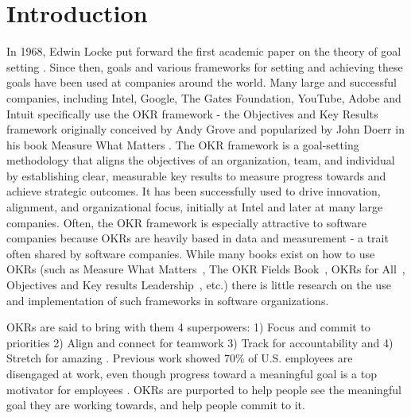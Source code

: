 \documentclass[sigconf, nonacm]{acmart}
\begin{document}
\section{Introduction}
In 1968, Edwin Locke put forward the first academic paper on the theory of goal setting \cite{locke}. Since then, goals and various frameworks for setting and achieving these goals have been used at companies around the world. Many large and successful companies, including Intel, Google, The Gates Foundation, YouTube, Adobe and Intuit specifically use the OKR framework - the Objectives and Key Results framework originally conceived by Andy Grove and popularized by John Doerr in his book Measure What Matters \cite{Doerr01}. The OKR framework is a goal-setting methodology that aligns the objectives of an organization, team, and individual by establishing clear, measurable key results to measure progress towards and achieve strategic outcomes.  It has been successfully used to drive innovation, alignment, and organizational focus, initially at Intel and later at many large companies\cite{Doerr01}. Often, the OKR framework is especially attractive to software companies because OKRs are heavily based in data and measurement - a trait often shared by software companies. While many books exist on how to use OKRs (such as Measure What Matters~\cite{Doerr01}, The OKR Fields Book~\cite{lamorte2022}, OKRs for All~\cite{vellore2022okrs}, Objectives and Key results Leadership~\cite{gray2019}, etc.) there is little research on the use and implementation of such frameworks in software organizations. 

OKRs are said to bring with them 4 superpowers: 1) Focus and commit to priorities 2) Align and connect for teamwork 3) Track for accountability and 4) Stretch for amazing \cite{Doerr01}. Previous work showed 70\% of U.S. employees are disengaged at work, even though progress toward a meaningful goal is a top motivator for employees \cite{HBR2016}. OKRs are purported to help people see the meaningful goal they are working towards, and help people commit to it. 

\end{document}

